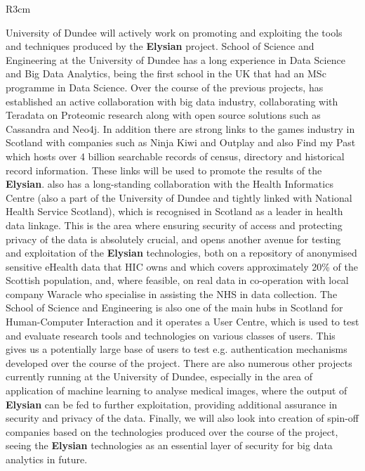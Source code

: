 \documentclass[a4paper,11pt]{article}
\newcommand{\project}[1]{\textbf{#1}\xspace}
\newcommand{\SECURITY}{\project{Elysian}}
\newcommand{\TheProject}{\SECURITY}
\begin{document}
\begin{wrapfigure}{R}{3cm}
\vspace{-1.4cm}
\hfill {}
\vspace{-0.9cm}
\end{wrapfigure}

University of Dundee will actively work on promoting and exploiting the tools and techniques produced by the \TheProject{} project. School of Science and Engineering at the University of Dundee has a long experience in Data Science and Big Data Analytics, being the first school in the UK that had an MSc programme in Data Science. Over the course of the previous projects, \UOD has established an active collaboration with big data industry, collaborating with Teradata  on Proteomic research along with open source solutions such as Cassandra and Neo4j. In addition there are strong links to the games industry in Scotland with companies such as Ninja Kiwi and Outplay and also Find my Past which hosts over 4 billion searchable records of census, directory and historical record information. These links will be used to promote the results of the \TheProject{}. \UOD also has a long-standing collaboration with the Health Informatics Centre (also a part of the University of Dundee and tightly linked with National Health Service Scotland), which is recognised in Scotland as a leader in health data linkage. This is the area where ensuring security of access and protecting privacy of the data is absolutely crucial, and opens another avenue for testing and exploitation of the \TheProject{} technologies, both on a repository of anonymised sensitive eHealth data that HIC owns and which covers approximately 20\% of the Scottish population, and, where feasible, on real data in co-operation with local company Waracle who specialise in assisting the NHS in data collection. The School of Science and Engineering is also one of the main hubs in Scotland for Human-Computer Interaction and it operates a User Centre, which is used to test and evaluate research tools and technologies on various classes of users. This gives us a potentially large base of users to test e.g. authentication mechanisms developed over the course of the project. There are also numerous other projects currently running at the University of Dundee, especially in the area of application of machine learning to analyse medical images, where the output of \TheProject{} can be fed to further exploitation, providing additional assurance in security and privacy of the data. Finally, we will also look into creation of spin-off companies based on the technologies produced over the course of the project, seeing the \TheProject{} technologies as an essential layer of security for big data analytics in future.
\end{document}
